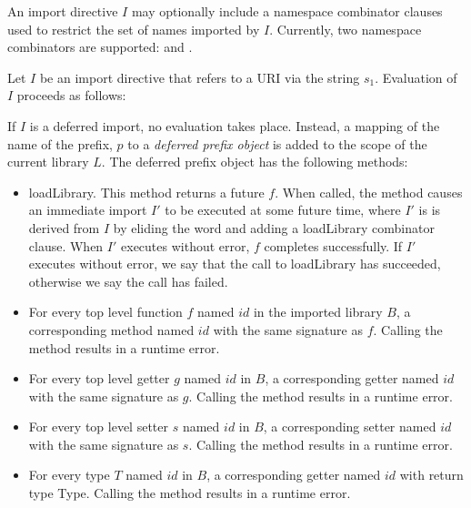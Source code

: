 \documentclass{article}
\newcommand{\code}[1]{{\sf #1}}
\begin{document}
\LMHash{}
An import directive $I$ may optionally include a namespace combinator clauses used to restrict the set of names imported by $I$. Currently, two namespace combinators are supported: \HIDE{} and \SHOW{}.

\LMHash{}
Let $I$ be an import directive that refers to a URI via the string $s_1$. Evaluation of $I$  proceeds as follows:

\LMHash{}
If $I$ is a deferred import, no evaluation takes place. Instead, a mapping of the name of the prefix, $p$ to a {\em deferred prefix object} is added to the scope of the current library $L$.
The deferred prefix object has the following methods:

\begin{itemize}
\item \code{loadLibrary}. This method returns a future $f$. When called, the method causes an immediate import $I'$ to be executed at some future time, where $I'$ is is derived from $I$ by eliding the word \DEFERRED{} and adding a \HIDE{} \code{loadLibrary}  combinator clause. When $I'$ executes without error, $f$ completes successfully. If $I'$ executes without error, we say that the call to \code{loadLibrary} has succeeded, otherwise we say the call has failed.
\item  For every top level function $f$ named $id$ in the imported library $B$, a corresponding method named $id$ with the same signature as $f$. Calling the method results in a runtime error.
\item For every top level getter $g$ named $id$ in $B$, a corresponding getter named $id$ with the same signature as $g$.  Calling the method results in a runtime error.
\item For every top level setter $s$ named $id$ in $B$, a corresponding setter named $id$ with the same signature as $s$.  Calling the method results in a runtime error.
\item For every type $T$ named $id$ in $B$, a corresponding getter named $id$ with return type \code{Type}.  Calling the method results in a runtime error.
\end{itemize}

\end{document}
